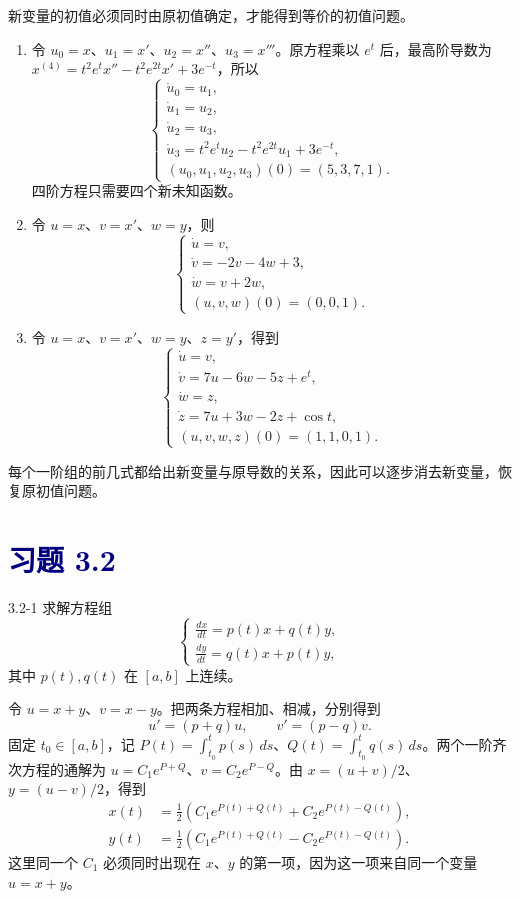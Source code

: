 \documentclass[UTF8,a4paper,11pt]{ctexart}
\newcommand{\sect}[1]{\section*{\textcolor{navy}{习题 #1}}}
\begin{document}
\begin{solution}
新变量的初值必须同时由原初值确定，才能得到等价的初值问题。
\begin{enumerate}[label=(\arabic*)]
\item 令 $u_0=x$、$u_1=x'$、$u_2=x''$、$u_3=x'''$。原方程乘以 $e^t$ 后，最高阶导数为
$x^{(4)}=t^2e^tx''-t^2e^{2t}x'+3e^{-t}$，所以
\[
\boxed{\begin{cases}
\dot u_0=u_1,\\\dot u_1=u_2,\\\dot u_2=u_3,\\
\dot u_3=t^2e^tu_2-t^2e^{2t}u_1+3e^{-t},\\
(u_0,u_1,u_2,u_3)(0)=(5,3,7,1).
\end{cases}}
\]
四阶方程只需要四个新未知函数。
\item 令 $u=x$、$v=x'$、$w=y$，则
\[
\boxed{\begin{cases}\dot u=v,\\\dot v=-2v-4w+3,\\
\dot w=v+2w,\\(u,v,w)(0)=(0,0,1).\end{cases}}
\]
\item 令 $u=x$、$v=x'$、$w=y$、$z=y'$，得到
\[
\boxed{\begin{cases}\dot u=v,\\
\dot v=7u-6w-5z+e^t,\\\dot w=z,\\
\dot z=7u+3w-2z+\cos t,\\
(u,v,w,z)(0)=(1,1,0,1).
\end{cases}}
\]
\end{enumerate}
每个一阶组的前几式都给出新变量与原导数的关系，因此可以逐步消去新变量，恢复原初值问题。
\end{solution}

\sect{3.2}
\begin{problem}{3.2-1}
求解方程组
  \[
  \begin{cases}
    \displaystyle \frac{dx}{dt}=p(t)x+q(t)y,\\[5pt]
    \displaystyle \frac{dy}{dt}=q(t)x+p(t)y,
  \end{cases}
  \]
  其中 $p(t),q(t)$ 在 $[a,b]$ 上连续。
\end{problem}

\begin{solution}
令 $u=x+y$、$v=x-y$。把两条方程相加、相减，分别得到
\[
u'=(p+q)u,\qquad v'=(p-q)v.
\]
固定 $t_0\in[a,b]$，记 $P(t)=\int_{t_0}^tp(s)\,ds$、$Q(t)=\int_{t_0}^tq(s)\,ds$。两个一阶齐次方程的通解为
$u=C_1e^{P+Q}$、$v=C_2e^{P-Q}$。由 $x=(u+v)/2$、$y=(u-v)/2$，得到
\[
\boxed{\begin{aligned}
x(t)&=\frac12\left(C_1e^{P(t)+Q(t)}+C_2e^{P(t)-Q(t)}\right),\\
y(t)&=\frac12\left(C_1e^{P(t)+Q(t)}-C_2e^{P(t)-Q(t)}\right).
\end{aligned}}
\]
这里同一个 $C_1$ 必须同时出现在 $x$、$y$ 的第一项，因为这一项来自同一个变量 $u=x+y$。
\end{solution}
\end{document}
